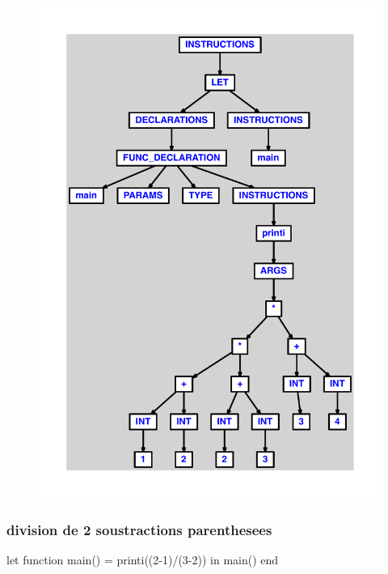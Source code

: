 \documentclass{article}
\begin{document}
\begin{figure}[H]\centering\includegraphics[max width=\textwidth]{ast/ast_104.pdf}\end{figure}\subsubsection{division de 2 soustractions parenthesees}
\begin{verbatimtab}
let function main() = printi((2-1)/(3-2)) in main() end
\end{verbatimtab}
\end{document}
